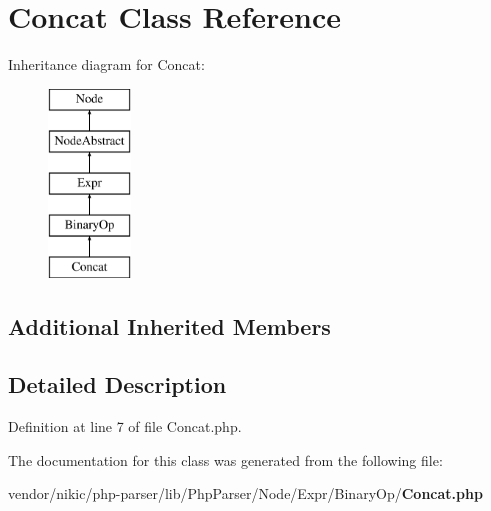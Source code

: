 \section{Concat Class Reference}
\label{class_php_parser_1_1_node_1_1_expr_1_1_binary_op_1_1_concat}
Inheritance diagram for Concat\+:\begin{figure}[H]
\begin{center}
\leavevmode
\includegraphics[height=5.000000cm]{class_php_parser_1_1_node_1_1_expr_1_1_binary_op_1_1_concat}
\end{center}
\end{figure}
\subsection*{Additional Inherited Members}


\subsection{Detailed Description}


Definition at line 7 of file Concat.\+php.



The documentation for this class was generated from the following file\+:\begin{DoxyCompactItemize}
\item 
vendor/nikic/php-\/parser/lib/\+Php\+Parser/\+Node/\+Expr/\+Binary\+Op/{\bf Concat.\+php}\end{DoxyCompactItemize}
